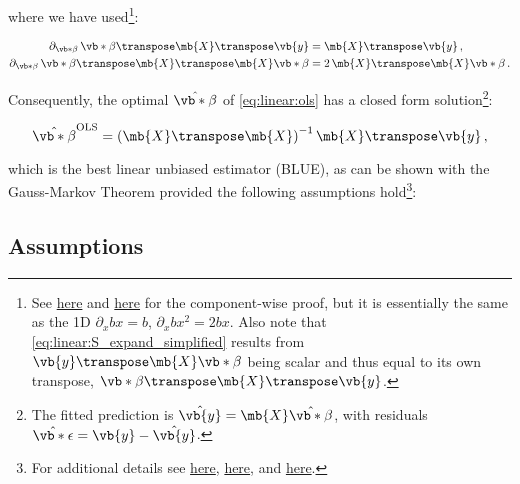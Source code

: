 \noindent where we have used\footnote{See \href{https://economictheoryblog.com/2015/02/19/ols_estimator/}{here}
and \href{https://economictheoryblog.com/2018/10/17/derivation-of-the-least-squares-estimator-for-beta-in-matrix-notation-proof-nr-1/}{here}
for the component-wise proof, but it is essentially the same as the 1D $\partial_{x} b x = b$, $\partial_{x} b x^{2} = 2 b x$.
Also note that \cref{eq:linear:S_expand_simplified} results from $\vb{y}\transpose \mb{X} \vb*{\beta}$ being scalar
and thus equal to its own transpose, $\vb*{\beta}\transpose \mb{X}\transpose \vb{y}$.}:

\begin{subequations} \label{eq:grad_relations}
\begin{align}
\partial_{\vb*{\beta}} \, \vb*{\beta}\transpose \mb{X}\transpose \vb{y} &= \mb{X}\transpose \vb{y}\,, \label{eq:grad_relations:1} \\
\partial_{\vb*{\beta}} \, \vb*{\beta}\transpose \mb{X}\transpose \mb{X} \vb*{\beta} &= 2 \, \mb{X}\transpose \mb{X} \vb*{\beta}\,. \label{eq:grad_relations:2}
\end{align}
\end{subequations}

Consequently, the optimal $\hat{\vb*{\beta}}$ of \cref{eq:linear:ols}
has a closed form solution\footnote{The fitted prediction is $\hat{\vb{y}} = \mb{X} \hat{\vb*{\beta}}$, with residuals $\hat{\vb*{\epsilon}} = \vb{y} - \hat{\vb{y}}$.}:

\begin{equation}\label{eq:linear:betahat_OLS}
\hat{\vb*{\beta}}^{\text{OLS}} = \left(\mb{X}\transpose\mb{X}\right)^{-1}\mb{X}\transpose \vb{y}\,,
\end{equation}

\noindent which is the best linear unbiased estimator (BLUE),
as can be shown with the Gauss-Markov Theorem provided
the following assumptions hold\footnote{For additional details see
\href{https://economictheoryblog.com/2015/04/01/ols_assumptions/}{here},
\href{http://people.duke.edu/~rnau/testing.htm}{here}, and
\href{https://economictheoryblog.com/2015/02/26/markov_theorem/}{here}.}:

\subsection{Assumptions}
\label{regression:linear:assumptions}

